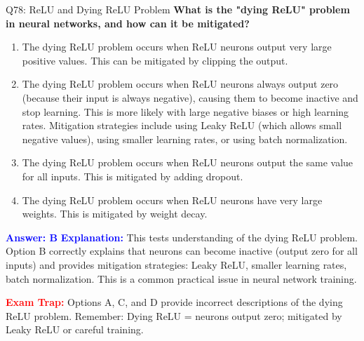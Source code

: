 \documentclass[8pt]{beamer}
\begin{document}
	\begin{frame}{Q78: ReLU and Dying ReLU Problem}
		\fontsize{6.5}{7.5}\selectfont
		\textbf{What is the "dying ReLU" problem in neural networks, and how can it be mitigated?}
		
		\begin{enumerate}
			\item The dying ReLU problem occurs when ReLU neurons output very large positive values. This can be mitigated by clipping the output.
			\item The dying ReLU problem occurs when ReLU neurons always output zero (because their input is always negative), causing them to become inactive and stop learning. This is more likely with large negative biases or high learning rates. Mitigation strategies include using Leaky ReLU (which allows small negative values), using smaller learning rates, or using batch normalization.
			\item The dying ReLU problem occurs when ReLU neurons output the same value for all inputs. This is mitigated by adding dropout.
			\item The dying ReLU problem occurs when ReLU neurons have very large weights. This is mitigated by weight decay.
		\end{enumerate}
		
		\vspace{0.1cm}
		\textcolor{blue}{\textbf{Answer: B}}
		\vspace{0.1cm}
		\textcolor{blue}{\textbf{Explanation:}} This tests understanding of the dying ReLU problem. Option B correctly explains that neurons can become inactive (output zero for all inputs) and provides mitigation strategies: Leaky ReLU, smaller learning rates, batch normalization. This is a common practical issue in neural network training.
		
		\textcolor{red}{\textbf{Exam Trap:}} Options A, C, and D provide incorrect descriptions of the dying ReLU problem. Remember: Dying ReLU = neurons output zero; mitigated by Leaky ReLU or careful training.
	\end{frame}
	
\end{document}
